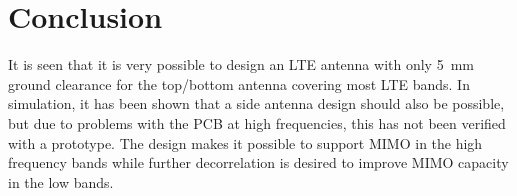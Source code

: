 \section{Conclusion}
\label{sec:conclusion}
It is seen that it is very possible to design an LTE antenna with only \SI{5}{mm} ground clearance for the top/bottom antenna covering most LTE bands. In simulation, it has been shown that a side antenna design should also be possible, but due to problems with the PCB at high frequencies, this has not been verified with a prototype. The design makes it possible to support MIMO in the high frequency bands while further decorrelation is desired to improve MIMO capacity in the low bands.

% 
% 
% 
% 
